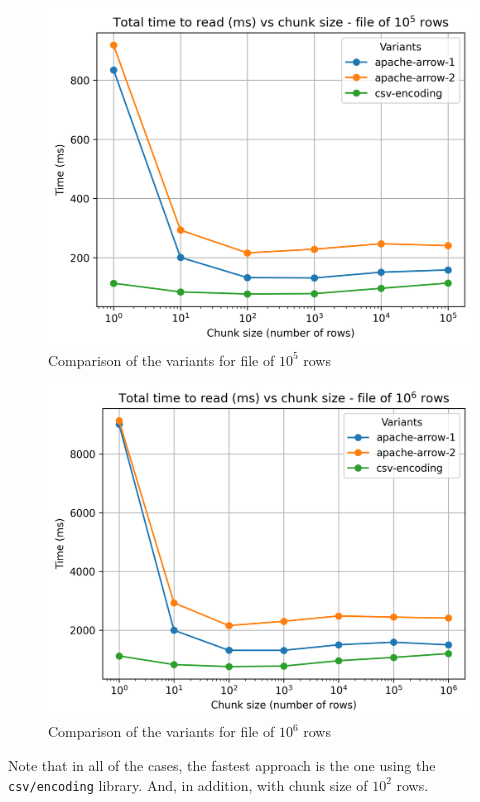 \documentclass[12pt,a4paper]{article}
\begin{document}
\begin{figure}[H]
  \centering
  \includegraphics[scale = 0.7]{images/4-Experiments/read-input-10-5.png}
  \caption{Comparison of the variants for file of $10^5$ rows}
\end{figure}

\begin{figure}[H]
  \centering
  \includegraphics[scale = 0.7]{images/4-Experiments/read-input-10-6.png}
  \caption{Comparison of the variants for file of $10^6$ rows}
\end{figure}

Note that in all of the cases, the fastest approach is the one using the \texttt{csv/encoding} library. And, in addition, with chunk size of $10^2$ rows.
\end{document}
